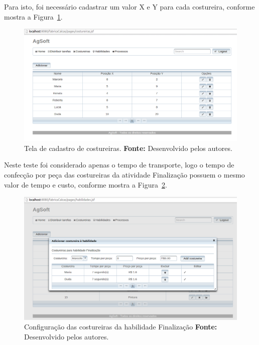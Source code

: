 \par Para isto, foi necessário cadastrar um valor X e Y para cada costureira, 
conforme mostra a Figura~\ref{fig:add_xy_costureira_teste4}.




\begin{figure}[h!]
	\centerline{\includegraphics[scale=0.3]{./imagens/posicao_xy_costureiras_teste4.png}}
	\caption[Tela de cadastro de costureiras.]
	{Tela de cadastro de costureiras. \textbf{Fonte:} Desenvolvido pelos autores.}
	\label{fig:add_xy_costureira_teste4}
\end{figure}



\par Neste teste foi considerado apenas o tempo de transporte, logo o tempo de
confecção por peça das costureiras da atividade Finalização possuem o mesmo
valor de tempo e custo, conforme mostra a Figura~\ref{fig:at_finalizacao_teste4}.


\begin{figure}[h!]
	\centerline{\includegraphics[scale=0.3]{./imagens/cofig_at_finalizaca_teste4.png}}
	\caption[Configuração das costureiras da habilidade Finalização.]
	{Configuração das costureiras da habilidade Finalização \textbf{Fonte:}
	Desenvolvido pelos autores.}
	\label{fig:at_finalizacao_teste4}
\end{figure}



